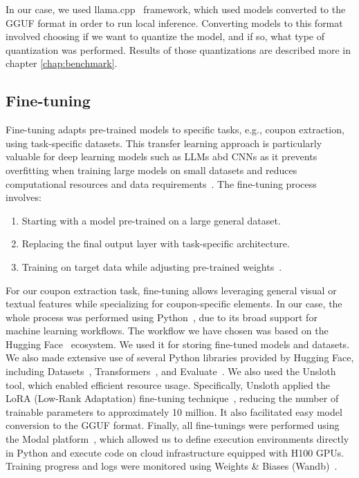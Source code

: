 \documentclass[licencjacka,en]{pracamgr}
\begin{document}
In our case, we used llama.cpp~\cite{llama-cpp} framework, which used models converted to the GGUF format in order to run local inference. Converting models to this format involved choosing if we want to quantize the model, and if so, what type of quantization was performed. Results of those quantizations are described more in chapter \ref{chap:benchmark}.

\subsection{Fine-tuning}
Fine-tuning adapts pre-trained models to specific tasks, e.g., coupon extraction, using task-specific datasets. This transfer learning approach is particularly valuable for deep learning models such as LLMs abd CNNs as it prevents overfitting when training large models on small datasets and reduces computational resources and data requirements~\cite{ibm_fine-tuning}. The fine-tuning process involves:
\begin{enumerate}
    \item Starting with a model pre-trained on a large general dataset.
    \item Replacing the final output layer with task-specific architecture.
    \item Training on target data while adjusting pre-trained weights~\cite{finetune_cool_image}.
\end{enumerate}

For our coupon extraction task, fine-tuning allows leveraging general visual or textual features while specializing for coupon-specific elements. In our case, the whole process was performed using Python~\cite{python}, due to its broad support for machine learning workflows. The workflow we have chosen was based on the Hugging Face~\cite{hugging-face} ecosystem. We used it for storing fine-tuned models and datasets. We also made extensive use of several Python libraries provided by Hugging Face, including Datasets~\cite{lhoest2021datasetscommunitylibrarynatural}, Transformers~\cite{wolf-etal-2020-transformers}, and Evaluate~\cite{evaluate}. We also used the Unsloth~\cite{unsloth} tool, which enabled efficient resource usage. Specifically, Unsloth applied the LoRA (Low-Rank Adaptation) fine-tuning technique~\cite{hu2021loralowrankadaptationlarge}, reducing the number of trainable parameters to approximately 10 million. It also facilitated easy model conversion to the GGUF format. Finally, all fine-tunings were performed using the Modal platform~\cite{modal}, which allowed us to define execution environments directly in Python and execute code on cloud infrastructure equipped with H100 GPUs. Training progress and logs were monitored using Weights \& Biases (Wandb)~\cite{wandb}.
\end{document}
